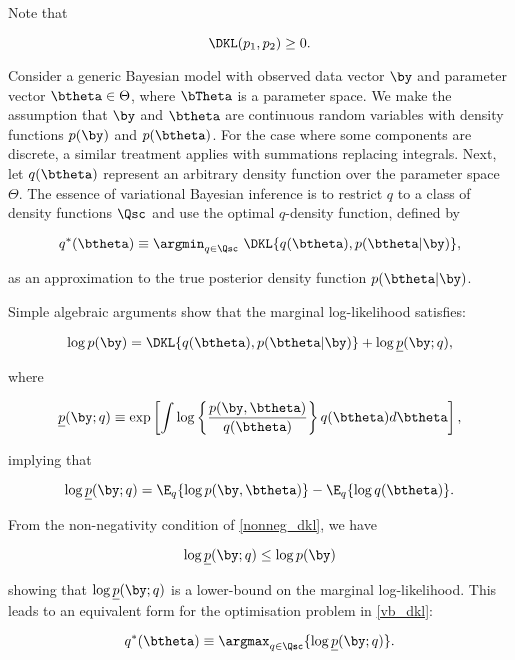 \documentclass[12pt]{article}
\theoremstyle{plain}
\theoremstyle{definition}
\theoremstyle{remark}
\begin{document}
\noindent Note that

\begin{equation}
	\DKL (p_1, p_2) \ge 0.
\label{nonneg_dkl}
\end{equation}

Consider a generic Bayesian model with observed data vector $\by$ and parameter vector $\btheta \in \Theta$,
where $\bTheta$ is a parameter space. We make the
assumption that $\by$ and $\btheta$ are continuous random variables with density functions $p(\by)$ and $p(\btheta)$.
For the case where some components are discrete, a similar treatment applies with summations replacing integrals.
Next, let $q (\btheta)$ represent an arbitrary density function over the parameter space $\Theta$. The essence of
variational Bayesian inference is to restrict $q$ to a class of density functions $\Qsc$ and use the optimal $q$-density
function, defined by

\begin{equation}
	q^* (\btheta) \equiv \argmin_{q \in \Qsc} \ \DKL \{ q(\btheta), p (\btheta | \by) \},
\label{vb_dkl}
\end{equation}

\noindent as an approximation to the true posterior density function $p (\btheta | \by)$.

Simple algebraic arguments \cite[Section~2.1]{ormerod10} show that the marginal log-likelihood satisfies:

\[
	\log p (\by) = \DKL \{ q(\btheta), p (\btheta | \by) \} + \log \underline{p} (\by; q),
\]

\noindent where

\[
	\underline{p} (\by; q)
		\equiv \exp \left[
			\int \log \left\{
				\frac{p (\by, \btheta)}{q (\btheta)}
			\right\} q (\btheta) d\btheta
		\right],
\]

\noindent implying that

\[
	\log \underline{p} (\by; q) = \E_q \{ \log p (\by, \btheta) \} - \E_q \{ \log q (\btheta) \}.
\]

\noindent From the non-negativity condition of \eqref{nonneg_dkl}, we have

\[
	\log \underline{p} (\by; q) \le \log p (\by)
\]

\noindent showing that $\log \underline{p} (\by; q)$
is a lower-bound on the marginal log-likelihood. This leads to an
equivalent form for the optimisation problem in \eqref{vb_dkl}:

\begin{equation}
	q^* (\btheta) \equiv \argmax_{q \in \Qsc} \{ \log \underline{p} (\by; q) \}.
\label{vb_elbo}
\end{equation}
\end{document}
